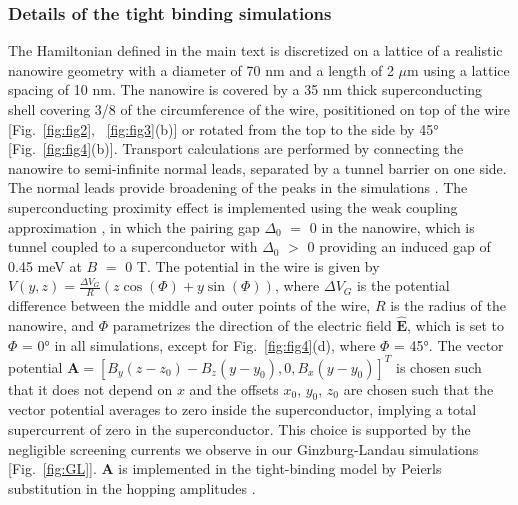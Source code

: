 \subsubsection{Details of the tight binding simulations}
The Hamiltonian defined in the main text is discretized on a lattice of a realistic nanowire geometry with a diameter of 70 nm and a length of 2 $\mu$m using a lattice spacing of 10 nm.
The nanowire is covered by a 35 nm thick superconducting shell covering 3/8 of the circumference of the wire, posititioned on top of the wire [Fig.~\ref{fig:fig2}, ~\ref{fig:fig3}(b)] or rotated from the top to the side by \ang{45} [Fig.~\ref{fig:fig4}(b)].
Transport calculations are performed by connecting the nanowire to semi-infinite normal leads, separated by a tunnel barrier on one side.
The normal leads provide broadening of the peaks in the simulations \cite{Liu2017a,Danon2017}.
The superconducting proximity effect is implemented using the weak coupling approximation \cite{Nijholt2016}, in which the pairing gap $\Delta_0$ $=$ 0 in the nanowire, which is tunnel coupled to a superconductor with $\Delta_0$ $>$ 0 providing an induced gap of 0.45 meV at $B$ $=$ 0 T.
The potential in the wire is given by $V(y,z)= \frac{\Delta V_G}{R} (z\cos(\Phi)+y\sin(\Phi))$, where $\Delta V_G$ is the potential difference between the middle and outer points of the wire, $R$ is the radius of the nanowire, and $\Phi$ parametrizes the direction of the electric field $\mathbf{\hat{E}}$, which is set to $\Phi$ = \ang{0} in all simulations, except for Fig.~\ref{fig:fig4}(d), where $\Phi$ = \ang{45}.
The vector potential $\mathbf{A} = \left[B_y(z-z_0)-B_z(y-y_0),0,B_x(y-y_0)\right]^T$ is chosen such that it does not depend on $x$ and the offsets $x_0$, $y_0$, $z_0$ are chosen such that the vector potential averages to zero inside the superconductor, implying a total supercurrent of zero in the superconductor.
This choice is supported by the negligible screening currents we observe in our Ginzburg-Landau simulations [Fig.~\ref{fig:GL}].
$\mathbf{A}$ is implemented in the tight-binding model by Peierls substitution in the hopping amplitudes \cite{Hofstadter1976}.

